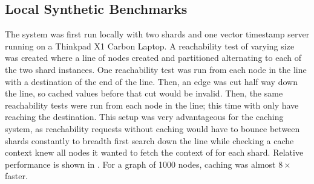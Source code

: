\documentclass[letterpaper,twocolumn,11pt,tight]{article}
\begin{document}
\subsection{Local Synthetic Benchmarks}
The system was first run locally with two shards and one vector timestamp server running on a Thinkpad X1 Carbon Laptop. A reachability test of varying size was created where a line of nodes created and partitioned alternating to each of the two shard instances. One reachability test was run from each node in the line with a destination of the end of the line. Then, an edge was cut half way down the line, so cached values before that cut would be invalid.
Then, the same reachability tests were run from each node in the line; this time with only have reaching the destination. This setup was very advantageous for the caching system, as reachability requests without caching would have to bounce between shards constantly to breadth first search down the line while checking a cache context knew all nodes it wanted to fetch the context of for each shard. Relative performance is shown in . For a graph of 1000 nodes, caching was almost $8\times$ faster.
\end{document}
